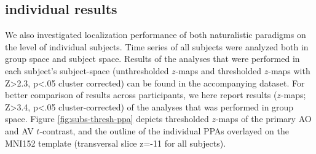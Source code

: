 \documentclass[english]{article}
\begin{document}
\subsection{individual results}


We also investigated localization performance of both naturalistic paradigms on
the level of individual subjects.
Time series of all subjects were analyzed both in group space and subject space.
Results of the analyses that were performed in each subject's subject-space
(unthresholded $z$-maps and thresholded $z$-maps with Z>2.3, p<.05 cluster
corrected) can be found in the accompanying dataset.
For better comparison of results across participants, we here report results
($z$-maps; Z>3.4, p<.05 cluster-corrected) of the analyses that was performed in
group space.
Figure \ref{fig:subs-thresh-ppa} depicts thresholded $z$-maps of the primary AO
and AV $t$-contrast, and the outline of the individual PPAs
\citep{sengupta2016extension} overlayed on the MNI152 template (transversal slice z=-11 for all subjects).

\end{document}
